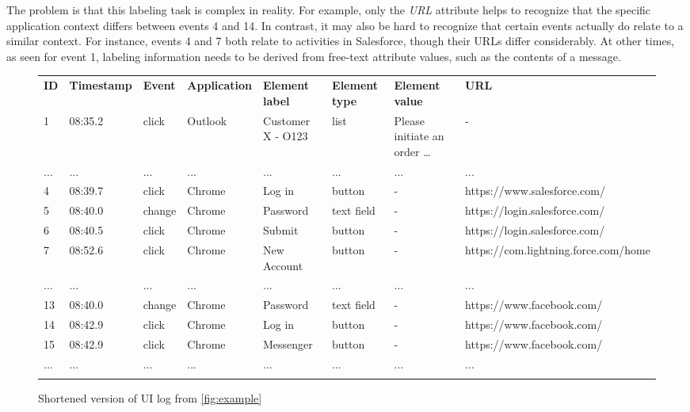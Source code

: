 The problem is that this labeling task is complex in reality. For example, only the \textit{URL} attribute helps to recognize that the specific application context differs between events 4 and 14.
In contrast, it may also be hard to recognize that certain events actually do relate to a similar context. For instance, events 4 and 7 both relate to activities in Salesforce, though their URLs differ considerably. At other times, as seen for event 1, labeling information needs to be derived from free-text attribute values, such as the contents of a message.


\begin{figure}[h!]
	\centering
	\begin{adjustbox}{max width=\textwidth}
		\begin{tabular}{llllllll}
			\hline\noalign{\smallskip}\noalign{\smallskip}
			\textbf{ID} &\textbf{Timestamp}&\textbf{Event}&\textbf{Application}&\textbf{Element label}&\textbf{Element type}&\textbf{Element value}&\textbf{URL}\\
			\noalign{\smallskip}\hline\noalign{\smallskip}
			1&08:35.2&click&Outlook&Customer X - O123&list&Please initiate an order …&-\\\noalign{\smallskip}
			...&...&...&...&...&...&...&...\\
			4&08:39.7&click&Chrome&Log in&button&-&https://www.salesforce.com/\\\noalign{\smallskip}
			5&08:40.0&change&Chrome&Password&text field&-&https://login.salesforce.com/\\\noalign{\smallskip}
			6&08:40.5&click&Chrome&Submit&button&-&https://login.salesforce.com/\\\noalign{\smallskip}
			7&08:52.6&click&Chrome&New Account&button&-&https://com.lightning.force.com/home\\\noalign{\smallskip}
			...&...&...&...&...&...&...&...\\
			13&08:40.0&change&Chrome&Password&text field&-&https://www.facebook.com/\\\noalign{\smallskip}
			14&08:42.9&click&Chrome&Log in&button&-&https://www.facebook.com/\\\noalign{\smallskip}
			15&08:42.9&click&Chrome&Messenger&button&-&https://www.facebook.com/\\\noalign{\smallskip}
			...&...&...&...&...&...&...&...\\
			\hline\noalign{\smallskip}
		\end{tabular}
	\end{adjustbox}
	\caption{Shortened version of UI log from \autoref{fig:example}}
	\label{fig:example_short}
\end{figure}

